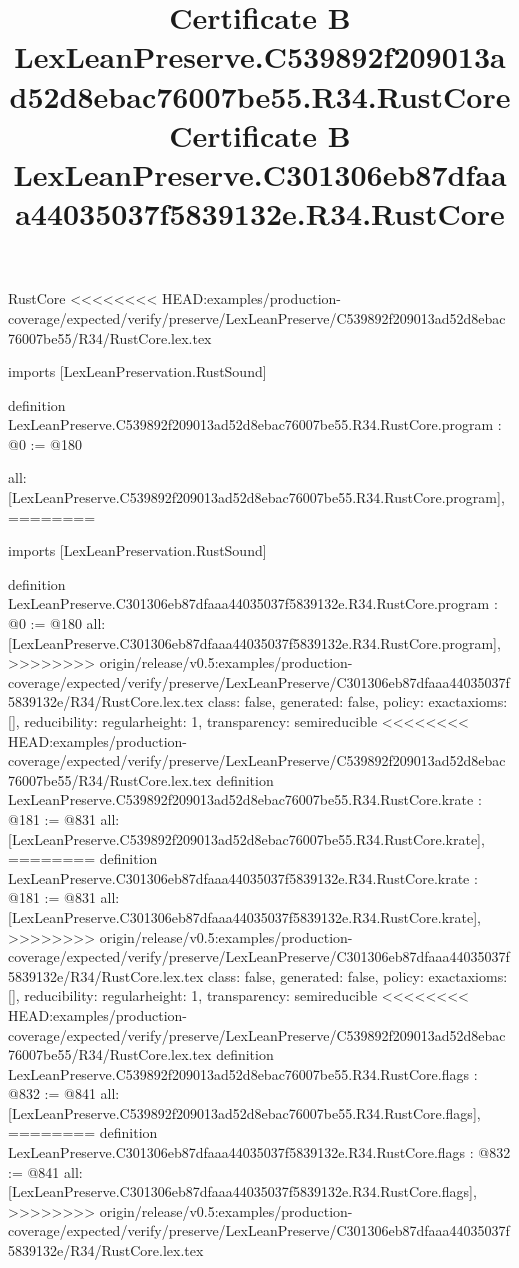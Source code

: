 \begin{lexlean}{RustCore}
<<<<<<<< HEAD:examples/production-coverage/expected/verify/preserve/LexLeanPreserve/C539892f209013ad52d8ebac76007be55/R34/RustCore.lex.tex
\title{Certificate B LexLeanPreserve.C539892f209013ad52d8ebac76007be55.R34.RustCore}
\begin{coremodule}
imports [LexLeanPreservation.RustSound]

definition LexLeanPreserve.C539892f209013ad52d8ebac76007be55.R34.RustCore.program : @0 := @180 {
  all: [LexLeanPreserve.C539892f209013ad52d8ebac76007be55.R34.RustCore.program],
========
\title{Certificate B LexLeanPreserve.C301306eb87dfaaa44035037f5839132e.R34.RustCore}
\begin{coremodule}
imports [LexLeanPreservation.RustSound]

definition LexLeanPreserve.C301306eb87dfaaa44035037f5839132e.R34.RustCore.program : @0 := @180 {
  all: [LexLeanPreserve.C301306eb87dfaaa44035037f5839132e.R34.RustCore.program],
>>>>>>>> origin/release/v0.5:examples/production-coverage/expected/verify/preserve/LexLeanPreserve/C301306eb87dfaaa44035037f5839132e/R34/RustCore.lex.tex
  class: false,
  generated: false,
  policy: exact{axioms: []},
  reducibility: regular{height: 1},
  transparency: semireducible
}
<<<<<<<< HEAD:examples/production-coverage/expected/verify/preserve/LexLeanPreserve/C539892f209013ad52d8ebac76007be55/R34/RustCore.lex.tex
definition LexLeanPreserve.C539892f209013ad52d8ebac76007be55.R34.RustCore.krate : @181 := @831 {
  all: [LexLeanPreserve.C539892f209013ad52d8ebac76007be55.R34.RustCore.krate],
========
definition LexLeanPreserve.C301306eb87dfaaa44035037f5839132e.R34.RustCore.krate : @181 := @831 {
  all: [LexLeanPreserve.C301306eb87dfaaa44035037f5839132e.R34.RustCore.krate],
>>>>>>>> origin/release/v0.5:examples/production-coverage/expected/verify/preserve/LexLeanPreserve/C301306eb87dfaaa44035037f5839132e/R34/RustCore.lex.tex
  class: false,
  generated: false,
  policy: exact{axioms: []},
  reducibility: regular{height: 1},
  transparency: semireducible
}
<<<<<<<< HEAD:examples/production-coverage/expected/verify/preserve/LexLeanPreserve/C539892f209013ad52d8ebac76007be55/R34/RustCore.lex.tex
definition LexLeanPreserve.C539892f209013ad52d8ebac76007be55.R34.RustCore.flags : @832 := @841 {
  all: [LexLeanPreserve.C539892f209013ad52d8ebac76007be55.R34.RustCore.flags],
========
definition LexLeanPreserve.C301306eb87dfaaa44035037f5839132e.R34.RustCore.flags : @832 := @841 {
  all: [LexLeanPreserve.C301306eb87dfaaa44035037f5839132e.R34.RustCore.flags],
>>>>>>>> origin/release/v0.5:examples/production-coverage/expected/verify/preserve/LexLeanPreserve/C301306eb87dfaaa44035037f5839132e/R34/RustCore.lex.tex
}}}
\end{coremodule}}
\end{coremodule}
\end{lexlean}
